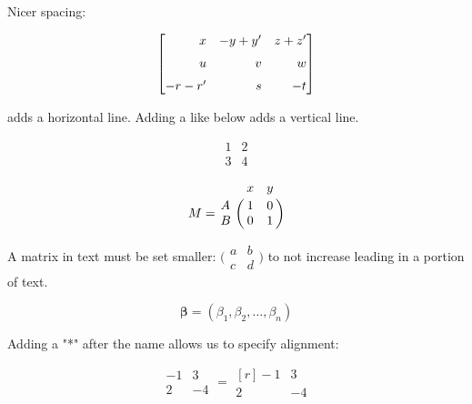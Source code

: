 Nicer spacing:\\
\begin{example}
\begin{equation*}
  \begin{bmatrix*}[r]
    x    & -y+y' & z+z'\medskip  \\
    u    &  v    & w   \medskip  \\
    -r-r'&  s    & -t
  \end{bmatrix*}
\end{equation*}
\end{example}

 adds a horizontal line. Adding a \code{|} like below adds a vertical line.\\
\begin{example}
\[
\begin{array}{c|c}
  1 & 2 \\ 
  \hline
  3 & 4
 \end{array}
\]
\end{example}

\begin{example}
\[
M = \bordermatrix{~ & x & y \cr
                  A & 1 & 0 \cr
                  B & 0 & 1 \cr}
\]
\end{example}

\begin{example}
A matrix in text must be set smaller:
$\bigl(\begin{smallmatrix}
a&b \\ c&d
\end{smallmatrix} \bigr)$
to not increase leading in a portion of text.
\end{example}


\begin{example}
\[
  \boldsymbol{\beta} =
     (\beta_1,\beta_2,\dotsc,\beta_n)
\]
\end{example}

Adding a "*" after the name allows us to specify alignment:

\begin{example}
\[
\begin{matrix}
  -1 & 3 \\
  2 & -4
 \end{matrix}
 =
 \begin{matrix*}[r]
  -1 & 3 \\
  2 & -4
 \end{matrix*}
\]
\end{example}